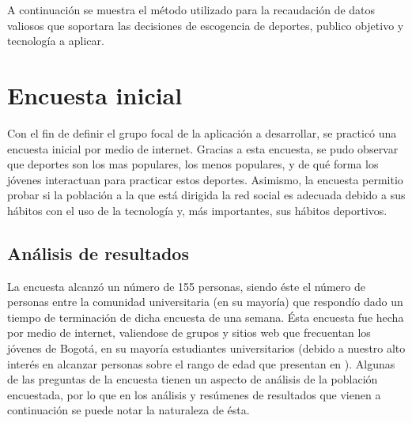 A continuación se muestra el método utilizado para la recaudación de datos valiosos que soportara las decisiones de escogencia de deportes, publico objetivo y tecnología a aplicar.

\section{Encuesta inicial}

Con el fin de definir el grupo focal de la aplicación a desarrollar, se practicó una encuesta inicial por medio de internet. Gracias a esta encuesta, se pudo observar que deportes son los mas populares, los menos populares, y de qué forma los jóvenes interactuan para practicar estos deportes. Asimismo, la encuesta permitio probar si la población a la que está dirigida la red social es adecuada debido a sus hábitos con el uso de la tecnología y, más importantes, sus hábitos deportivos.

\subsection{Análisis de resultados}

La encuesta alcanzó un número de 155 personas, siendo éste el número de personas entre la comunidad universitaria (en su mayoría) que respondío dado un tiempo de terminación de dicha encuesta de una semana. Ésta encuesta fue hecha por medio de internet, valiendose de grupos y sitios web que frecuentan los jóvenes de Bogotá, en su mayoría estudiantes universitarios (debido a nuestro alto interés en alcanzar personas sobre el rango de edad que presentan en \cite{user_behavior_online}). Algunas de las preguntas de la encuesta tienen un aspecto de análisis de la población encuestada, por lo que en los análisis y resúmenes de resultados que vienen a continuación se puede notar la naturaleza de ésta.\\

